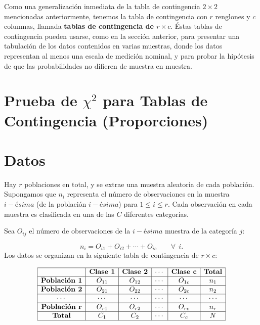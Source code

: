 \documentclass[
  a4paper,
  oneside,
  openany]{book}
\begin{document}
Como una generalización inmediata de la tabla de contingencia \(2 \times 2\) mencionadas anteriormente, tenemos la tabla de contingencia con \(r\) renglones y \(c\) columnas, llamada \textbf{tablas de contingencia de \(r \times c\)}.
Éstas tablas de contingencia pueden usarse, como en la sección anterior, para presentar una tabulación de los datos contenidos en varias muestras, donde los datos representan al menos una escala de medición nominal, y para probar la hipótesis de que las probabilidades no difieren de muestra en muestra.

\hypertarget{prueba-de-chi2-para-tablas-de-contingencia-proporciones}{%
\section*{\texorpdfstring{Prueba de \(\chi^2\) para Tablas de Contingencia (Proporciones)}{Prueba de \textbackslash chi\^{}2 para Tablas de Contingencia (Proporciones)}}\label{prueba-de-chi2-para-tablas-de-contingencia-proporciones}}


\hypertarget{datos-12}{%
\section{Datos}\label{datos-12}}

Hay \(r\) poblaciones en total, y se extrae una muestra aleatoria de cada población. Supongamos que \(n_{i}\) representa el número de observaciones en la muestra \(i-ésima\) (de la población \(i-ésima\)) para \(1 \leq i \leq r\). Cada observación en cada muestra es clasificada en una de las \(C\) diferentes categorías.

Sea \(O_{ij}\) el número de observaciones de la \(i-ésima\) muestra de la categoría \(j\):

\[n_{i}= O_{i1}+O_{i2}+\cdots+O_{ic}\ \ \ \ \ \ \ \ \   \forall \ \ i.\]
Los datos se organizan en la siguiente tabla de contingencia de \(r \times c\):

\[
\begin{array}{|c|c|c|c|c|c|}
\hline
 & \textbf{Clase 1}  & \textbf{Clase 2}    & \cdots & \textbf{Clase c} &\textbf{Total}     \\
\hline
\textbf{Población 1} & O_{11} & O_{12} & \cdots & O_{1c} & n_{1}   \\
\hline
\textbf{Población 2} & O_{21} & O_{22} & \cdots & O_{2c} & n_{2}\\
\hline
\cdots    & \cdots & \cdots & \cdots & \cdots & \cdots\\
\hline
\textbf{Población r} &O_{r1} & O_{r2} & \cdots & O_{rc} & n_{r}\\
\hline
\textbf{Total}       & C_{1}  & C_{2}  & \cdots & C_{c}  & N \\
\hline
\end{array}
\]
\end{document}
